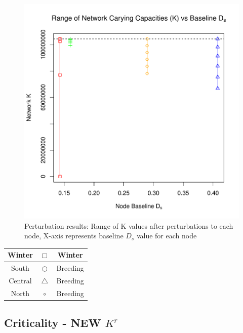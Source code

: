 \documentclass[10pt]{article}
\begin{document}
\vspace{-.5cm}
\begin{figure}[H]
\begin{center}
\includegraphics[width=.8\textwidth, height=.8\textwidth]{RGraphics-monarch_barcr_DS}
\caption{Perturbation results: Range of K values after perturbations to each node, X-axis represents baseline $D_s$ value for each node}\label{fig:monarch_barcr_DS}
\end{center}
\end{figure}

\vspace{-.5cm}
\begin{tabular}{|c|c|c|}
\hline
{\color{red} Winter} & $\Box$ & Winter \\
\hline
{\color{orange} South} & $\bigcirc$ & Breeding \\
\hline
{\color{blue} Central} & $\triangle$ &  Breeding \\
\hline
{\color{green} North} & $\circ$ & Breeding \\
\hline
\end{tabular}






\newpage
\subsection{Criticality - NEW \texorpdfstring{$K^r$}{KR}}
\end{document}
